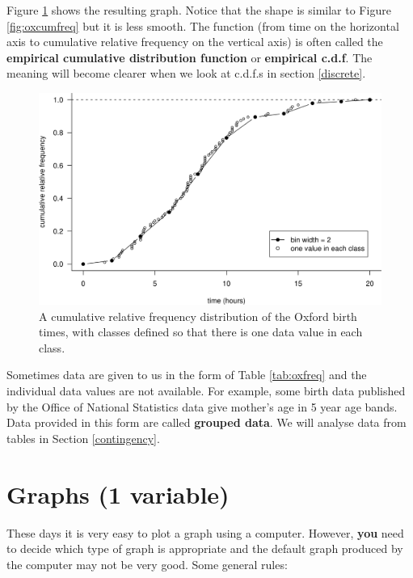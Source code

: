 \documentclass[
  british,
]{book}
\begin{document}
Figure \ref{fig:oxcumfreq2} shows the resulting graph. Notice that the shape is similar to Figure \ref{fig:oxcumfreq} but it is less smooth. The function (from time on the horizontal axis to cumulative relative frequency on the vertical axis) is often called the \textbf{empirical cumulative distribution function} or \textbf{empirical c.d.f}. The meaning will become clearer when we look at c.d.f.s in section \ref{discrete}.

\begin{figure}

{\centering \includegraphics[width=0.8\linewidth]{images/ox_cum_freq2} 

}

\caption{A cumulative relative frequency distribution of the Oxford birth times, with classes defined so that there is one data value in each class.}\label{fig:oxcumfreq2}
\end{figure}
\FloatBarrier

Sometimes data are given to us in the form of Table \ref{tab:oxfreq} and the individual data values are not available. For example, some birth data published by the Office of National Statistics data give mother's age in 5 year age bands. Data provided in this form are called \textbf{grouped data}. We will analyse data from tables in Section \ref{contingency}.

\hypertarget{graphs}{%
\section{Graphs (1 variable)}\label{graphs}}

These days it is very easy to plot a graph using a computer. However, \textbf{you} need to decide which type of graph is appropriate and the default graph produced by the computer may not be very good. Some general rules:
\end{document}
